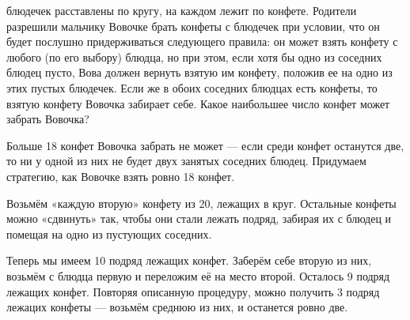 
\begin{itemize}

	 блюдечек расставлены по кругу, на каждом лежит по конфете. Родители разрешили мальчику Вовочке брать конфеты с блюдечек при условии, что он будет послушно придерживаться следующего правила: он может взять конфету с любого (по его выбору) блюдца, но при этом, если хотя бы одно из соседних блюдец пусто, Вова должен вернуть взятую им конфету, положив ее на одно из этих пустых блюдечек. Если же в обоих соседних блюдцах есть конфеты, то взятую конфету Вовочка забирает себе. Какое наибольшее число конфет может забрать Вовочка?
	
	\itr Больше 18 конфет Вовочка забрать не может — если среди конфет останутся две, то ни у одной из них не будет двух занятых соседних блюдец. Придумаем стратегию, как Вовочке взять ровно 18 конфет.
	
	Возьмём «каждую вторую» конфету из 20, лежащих в круг. Остальные конфеты можно «сдвинуть» так, чтобы они стали лежать подряд, забирая их с блюдец и помещая на одно из пустующих соседних.
	
	Теперь мы имеем 10 подряд лежащих конфет. Заберём себе вторую из них, возьмём с блюдца первую и переложим её на место второй. Осталось 9 подряд лежащих конфет. Повторяя описанную процедуру, можно получить 3 подряд лежацих конфеты — возьмём среднюю из них, и останется ровно две.

\end{itemize}